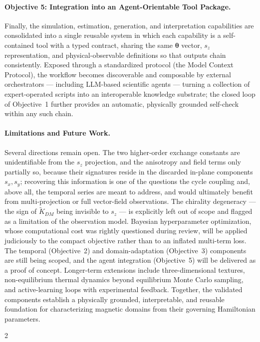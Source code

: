 \documentclass[letterpaper, 12, one column]{article}
\begin{document}
\paragraph{Objective 5: Integration into an Agent-Orientable Tool Package.}
Finally, the simulation, estimation, generation, and interpretation capabilities are consolidated into a single reusable system in which each capability is a self-contained tool with a typed contract, sharing the same $\boldsymbol{\theta}$ vector, $s_z$ representation, and physical-observable definitions so that outputs chain consistently. Exposed through a standardized protocol (the Model Context Protocol), the workflow becomes discoverable and composable by external orchestrators --- including LLM-based scientific agents --- turning a collection of expert-operated scripts into an interoperable knowledge substrate; the closed loop of Objective~1 further provides an automatic, physically grounded self-check within any such chain.

\paragraph{Limitations and Future Work.}
Several directions remain open. The two higher-order exchange constants are unidentifiable from the $s_z$ projection, and the anisotropy and field terms only partially so, because their signatures reside in the discarded in-plane components $s_x,s_y$; recovering this information is one of the questions the cycle coupling and, above all, the temporal series are meant to address, and would ultimately benefit from multi-projection or full vector-field observations. The chirality degeneracy --- the sign of $\tilde{K}_{DM}$ being invisible to $s_z$ --- is explicitly left out of scope and flagged as a limitation of the observation model. Bayesian hyperparameter optimization, whose computational cost was rightly questioned during review, will be applied judiciously to the compact objective rather than to an inflated multi-term loss. The temporal (Objective~2) and domain-adaptation (Objective~3) components are still being scoped, and the agent integration (Objective~5) will be delivered as a proof of concept. Longer-term extensions include three-dimensional textures, non-equilibrium thermal dynamics beyond equilibrium Monte Carlo sampling, and active-learning loops with experimental feedback. Together, the validated components establish a physically grounded, interpretable, and reusable foundation for characterizing magnetic domains from their governing Hamiltonian parameters.



\setlength{\columnsep}{0.3cm}
\begin{multicols}{2}
\footnotesize
\setlength{\itemsep}{0pt}
\setlength{\parskip}{3pt}

\end{multicols}
\end{document}
